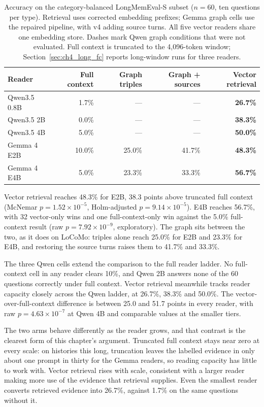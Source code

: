 \begin{table}[htbp]
  \centering
  \small
  \setlength{\tabcolsep}{5pt}
  \begin{tabular}{lrrrr}
    \toprule
    Reader & Full context & Graph triples & Graph + sources & Vector retrieval \\
    \midrule
    Qwen3.5 0.8B & 1.7\%  & ---    & ---    & \textbf{26.7\%} \\
    Qwen3.5 2B   & 0.0\%  & ---    & ---    & \textbf{38.3\%} \\
    Qwen3.5 4B   & 5.0\%  & ---    & ---    & \textbf{50.0\%} \\
    Gemma 4 E2B  & 10.0\% & 25.0\% & 41.7\% & \textbf{48.3\%} \\
    Gemma 4 E4B  & 5.0\%  & 23.3\% & 33.3\% & \textbf{56.7\%} \\
    \bottomrule
  \end{tabular}
  \caption{Accuracy on the category-balanced LongMemEval-S subset ($n=60$, ten questions per type).
  Retrieval uses corrected embedding prefixes; Gemma graph cells use the repaired pipeline, with
  v4 adding source turns. All five vector readers share one embedding store. Dashes mark Qwen
  graph conditions that were not evaluated. Full context is truncated to the 4,096-token window;
  Section~\ref{sec:ch4_long_fc} reports long-window runs for three readers.}
  \label{tab:ch4_lme}
\end{table}

Vector retrieval reaches 48.3\% for E2B, 38.3 points above truncated full context (McNemar
$p=1.52\times10^{-5}$, Holm-adjusted $p=9.14\times10^{-5}$). E4B reaches 56.7\%, with 32 vector-only wins and one full-context-only win
against the 5.0\% full-context result (raw $p=7.92\times10^{-9}$, exploratory). The graph sits
between the two, as it does on LoCoMo: triples alone reach 25.0\% for E2B and 23.3\% for E4B, and
restoring the source turns raises them to 41.7\% and 33.3\%.

The three Qwen cells extend the comparison to the full reader ladder. No full-context cell in any reader clears 10\%, and Qwen 2B answers
none of the 60 questions correctly under full context. Vector retrieval meanwhile tracks reader
capacity closely across the Qwen ladder, at 26.7\%, 38.3\% and 50.0\%. The vector-over-full-context
difference is between 25.0 and 51.7 points in every reader, with raw $p=4.63\times10^{-7}$ at Qwen
4B and comparable values at the smaller tiers.

The two arms behave differently as the reader grows, and that contrast is the clearest form of this
chapter's argument. Truncated full context stays near zero at every scale: on histories this long, truncation
leaves the labelled evidence in only about one prompt in thirty for the Gemma readers, so reading
capacity has little to work with. Vector retrieval rises with scale, consistent with a larger reader
making more use of the evidence that retrieval supplies. Even the smallest reader converts retrieved evidence into 26.7\%, against 1.7\% on
the same questions without it.


